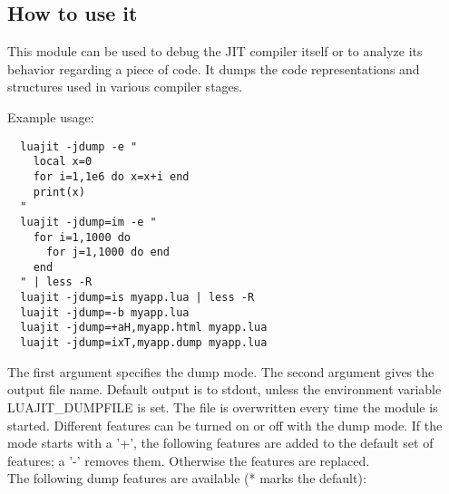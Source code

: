 

\subsection{How to use it}
\label{Subsec:dump-usage}

This module can be used to debug the JIT compiler itself or to analyze its
behavior regarding a piece of code. It dumps the
code representations and structures used in various compiler stages.

Example usage:
\begin{lstlisting}
  luajit -jdump -e "
    local x=0
    for i=1,1e6 do x=x+i end
    print(x)
  "
  luajit -jdump=im -e "
    for i=1,1000 do
      for j=1,1000 do end
    end
  " | less -R
  luajit -jdump=is myapp.lua | less -R
  luajit -jdump=-b myapp.lua
  luajit -jdump=+aH,myapp.html myapp.lua
  luajit -jdump=ixT,myapp.dump myapp.lua
\end{lstlisting}
The first argument specifies the dump mode. The second argument gives
the output file name. Default output is to stdout, unless the environment
variable LUAJIT\_DUMPFILE is set. The file is overwritten every time the
module is started. Different features can be turned on or off with the dump mode.
If the mode starts with a '+', the following features are added to the default
set of features; a '-' removes them. Otherwise the features are replaced.\\
The following dump features are available (* marks the default):

